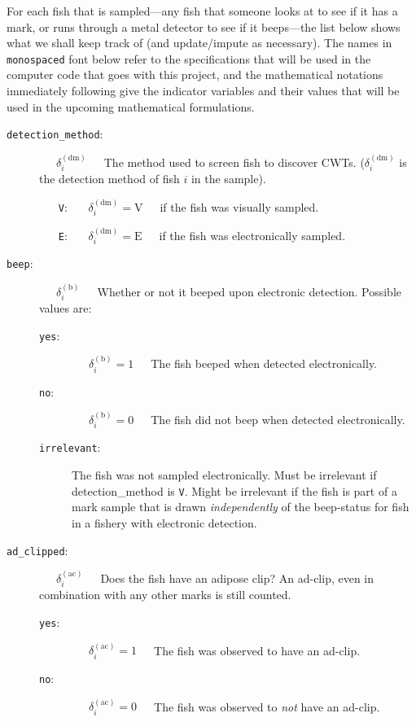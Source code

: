 \documentclass[11pt]{article}
\begin{document}
For each fish that is sampled---any fish that someone looks at to see if it has a mark, or
runs  through a metal detector to see if it beeps---the list below shows what we shall keep track of (and
update/impute as necessary).  The names in {\tt monospaced} font below refer to the specifications that
will be used in the computer code that goes with this project, and the mathematical notations immediately
following give
the indicator variables and their values that will be used in the upcoming mathematical formulations.
\begin{description}
	\item [{\tt detection\_method}:] ~~~$\delta_i^{(\mathrm{dm})}$~~~The method used to screen fish to discover CWTs. ($\delta_i^{(\mathrm{dm})}$ is the detection method of fish $i$ in the sample).
	\begin{itemize}
		\item [{\tt V}:] ~~~$\delta_i^{(\mathrm{dm})} = \mathrm{V}$~~~if the fish was visually sampled.
		\item [{\tt E}:] ~~~$\delta_i^{(\mathrm{dm})} = \mathrm{E}$~~~if the fish was electronically sampled.
	\end{itemize}
	\item [{\tt beep}:] ~~~$\delta_i^{(\mathrm{b})}$~~~Whether or not it beeped upon electronic detection. Possible values are:
	\begin{description}
		\item [{\tt yes}:] ~~~$\delta_i^{(\mathrm{b})} = 1$~~~The fish beeped when detected electronically.
		\item [{\tt no}:]  ~~~$\delta_i^{(\mathrm{b})} = 0$~~~The fish did not beep when detected electronically.
		\item [{\tt irrelevant}:] The fish was not sampled electronically.
		Must be irrelevant if detection\_method is {\tt V}. Might be irrelevant if the fish is part of a
		mark sample that is drawn {\em independently} of the beep-status for fish in a fishery with
		electronic detection.
	\end{description}
	\item [{\tt ad\_clipped}:]  ~~~$\delta_i^{(\mathrm{ac})}$~~~Does the fish have an adipose clip? 	An ad-clip, even in combination with any other marks is still counted.
	\begin{description}
		\item [{\tt yes}:]  ~~~$\delta_i^{(\mathrm{ac})} = 1$~~~The fish was observed to have an ad-clip.
		\item [{\tt no}:]  ~~~$\delta_i^{(\mathrm{ac})} = 0$~~~The fish was observed to {\em not} have an ad-clip.

\end{description}
\end{description}
\end{document}
